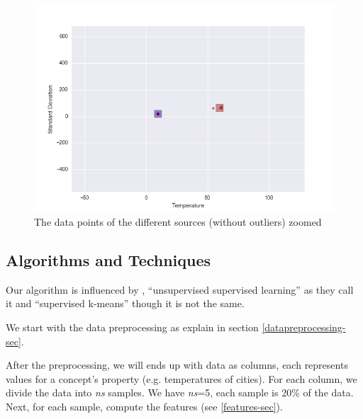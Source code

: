 \documentclass{article}
\begin{document}
\begin{figure}[!ht]
  \caption{The data points of the different sources (without outliers) zoomed}
  \label{fig:allsourcesmeans-no-outliers-zoom}
  \centering
    \includegraphics[width=1.0\textwidth]{allsourcesmeans_no_outliers_zoom}
\end{figure}


\subsection{Algorithms and Techniques}


Our algorithm is influenced by \cite{unsupervised-supervised}, ``unsupervised supervised learning'' as they call it and \cite{supervised-k} ``supervised k-means'' though it is not the same.



We start with the data preprocessing as explain in section \ref{datapreprocessing-sec}.

After the preprocessing, we will ends up with data as columns, each represents values for a concept's property (e.g. temperatures of cities). For each column, we divide the data into \textit{ns} samples. We have \textit{ns}=5, each sample is 20\% of the data. Next, for each sample, compute the features (see \ref{features-sec}). %
\end{document}
